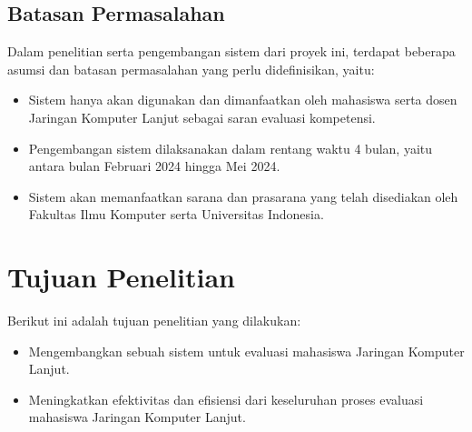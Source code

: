 \subsection{Batasan Permasalahan}
\label{sec:batasanMasalah}
Dalam penelitian serta pengembangan sistem dari proyek ini, terdapat beberapa asumsi dan batasan permasalahan yang perlu didefinisikan, yaitu:
\begin{itemize}
	\item Sistem hanya akan digunakan dan dimanfaatkan oleh mahasiswa serta dosen Jaringan Komputer Lanjut sebagai saran evaluasi kompetensi.
	\item Pengembangan sistem dilaksanakan dalam rentang waktu 4 bulan, yaitu antara bulan Februari 2024 hingga Mei 2024.
	\item Sistem akan memanfaatkan sarana dan prasarana yang telah disediakan oleh Fakultas Ilmu Komputer serta Universitas Indonesia.
\end{itemize}

\section{Tujuan Penelitian}
\label{sec:tujuan}
Berikut ini adalah tujuan penelitian yang dilakukan:
\begin{itemize}
	\item Mengembangkan sebuah sistem untuk evaluasi mahasiswa Jaringan Komputer Lanjut.
	\item Meningkatkan efektivitas dan efisiensi dari keseluruhan proses evaluasi mahasiswa Jaringan Komputer Lanjut.
\end{itemize}


